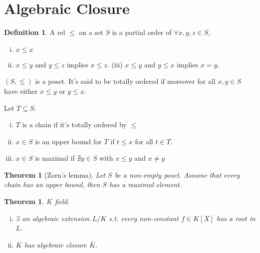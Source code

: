 \documentclass{article}
\theoremstyle{definition}
\newtheorem*{defn*}{Definition}
\theoremstyle{remark}
\theoremstyle{plain}
\newtheorem{thm}[defn]{Theorem}
\begin{document}
\section{Algebraic Closure}
\begin{defn*}
    A rel $\le $ on a set $S$ is a partial order of $\forall x,y,z\in S$, \begin{enumerate}[(i)]
        \item $x\le x$ \item $x\le y$ and $y\le z$ implies $x\le z$. (iii) $x\le y$ and $y\le x$ implies $x=y$.
    \end{enumerate}
    $(S,\le )$ is a poset.
    It's said to be totally ordered if moreover for all $x,y\in S$ have either $x\le y$ or $y\le x$.

    Let $T\subseteq S$.
    \begin{enumerate}[(i)]
        \item $T$ is a chain if it's totally ordered by $\le$
        \item $x\in S$ is an upper bound for $T$ if $t\le x$ for all $t\in T$.
        \item $x\in S$ is maximal if $\nexists y\in S$ with $x\le y$ and $x\neq y$
    \end{enumerate}
\end{defn*}
\begin{thm}[Zorn's lemma]
    Let $S$ be a non-empty poset. Assume that every chain has an upper bound, then $S$ has a maximal element.
\end{thm}
\begin{thm}
    $K$ field.
    \begin{enumerate}[(i)]
        \item $\exists$ an algebraic extension $L/K$ s.t. every non-constant $f\in K[X]$ has a root in $L$.
        \item $K$ has algebraic closure $\bar K$.
    \end{enumerate}
\end{thm}
\end{document}
